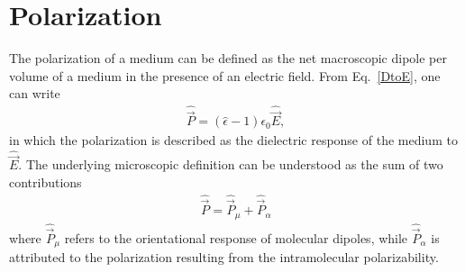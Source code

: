 






\section{Polarization}



The polarization of a medium can be defined as the net macroscopic dipole per volume of a medium in the presence of an electric field. From Eq.\ \ref{DtoE}, one can write
\begin{eqnarray}
\hat{\vec{P}} = (\hat{\epsilon} - 1) \epsilon_0  \hat{\vec{E}},
\label{polarizationvector}
\end{eqnarray}
\noindent in which the polarization is described as the dielectric response of the medium to $\hat{\vec{E}}$. The underlying microscopic definition can be understood as the sum of two contributions
\begin{eqnarray}
\hat{\vec{P}} = \hat{\vec{P}}_\mu + \hat{\vec{P}}_\alpha
\label{polarizationvectorSeparation}
\end{eqnarray}
where $\hat{\vec{P}}_\mu$ refers to the orientational response of molecular dipoles, while $\hat{\vec{P}}_\alpha$ is attributed to the polarization resulting from the intramolecular polarizability. 





